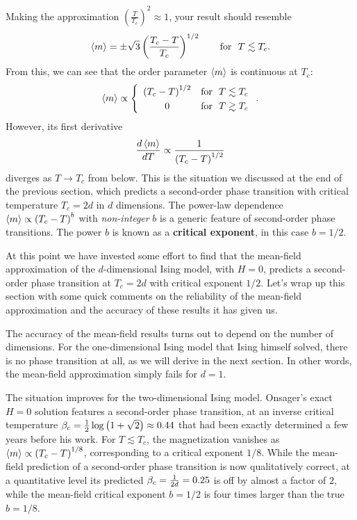 Making the approximation $\left(\frac{T}{T_c}\right)^2 \approx 1$, your result should resemble
\begin{equation*}
  \left\langle m \right\rangle = \pm \sqrt{3} \left(\frac{T_c - T}{T_c}\right)^{1 / 2} \qquad \mbox{for } \ T \lesssim T_c.
\end{equation*}
From this, we can see that the order parameter $\left\langle m \right\rangle$ is continuous at $T_c$:
\begin{equation}
  \left\langle m \right\rangle \propto \left\{\begin{array}{cl} \left(T_c - T\right)^{1 / 2} & \mbox{for } \ T \lesssim T_c \\[3 pt]
                                           0                            & \mbox{for } \ T \gtrsim T_c\end{array}\right. .
\end{equation}
However, its first derivative
\begin{equation*}
  \frac{d\left\langle m \right\rangle}{dT} \propto \frac{1}{\left(T_c - T\right)^{1 / 2}}
\end{equation*}
diverges as $T \to T_c$ from below.
This is the situation we discussed at the end of the previous section, which predicts a second-order phase transition with critical temperature $T_c = 2d$ in $d$ dimensions.
The power-law dependence $\left\langle m \right\rangle \propto \left(T_c - T\right)^b$ with \textit{non-integer} $b$ is a generic feature of second-order phase transitions. %
The power $b$ is known as a \textbf{critical exponent}, in this case $b = 1 / 2$.

At this point we have invested some effort to find that the mean-field approximation of the $d$-dimensional Ising model, with $H = 0$, predicts a second-order phase transition at $T_c = 2d$ with critical exponent $1 / 2$.
Let's wrap up this section with some quick comments on the reliability of the mean-field approximation and the accuracy of these results it has given us.

The accuracy of the mean-field results turns out to depend on the number of dimensions.
For the one-dimensional Ising model that Ising himself solved, there is no phase transition at all, as we will derive in the next section.
In other words, the mean-field approximation simply fails for $d = 1$.

The situation improves for the two-dimensional Ising model.
Onsager's exact $H = 0$ solution features a second-order phase transition, at an inverse critical temperature $\beta_c = \frac{1}{2} \log\left(1 + \sqrt{2}\right) \approx 0.44$ that had been exactly determined a few years before his work.
For $T \lesssim T_c$, the magnetization vanishes as $\left\langle m \right\rangle \propto \left(T_c - T\right)^{1 / 8}$, corresponding to a critical exponent $1 / 8$.
While the mean-field prediction of a second-order phase transition is now qualitatively correct, at a quantitative level its predicted $\beta_c = \frac{1}{2d} = 0.25$ is off by almost a factor of $2$, while the mean-field critical exponent $b = 1 / 2$ is four times larger than the true $b = 1 / 8$.

